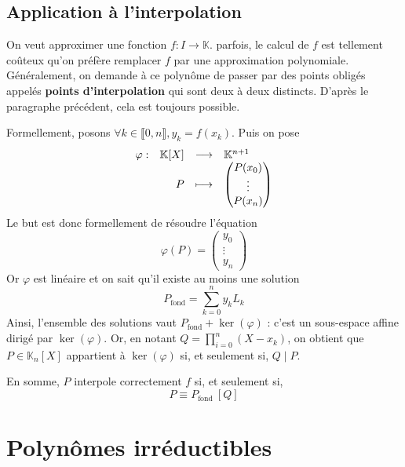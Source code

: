 \documentclass[french]{book}
\newcommand{\K}{\mathbb{K}}
\theoremstyle{plain}
\theoremstyle{definition}
\theoremstyle{remark}
\begin{document}
\subsection{Application à l'interpolation}
On veut approximer une fonction $f:I\rightarrow\K$. parfois, le calcul de $f$ est tellement coûteux qu'on préfère remplacer $f$ par une approximation polynomiale. Généralement, on demande à ce polynôme de passer par des points obligés appelés \textbf{points d'interpolation} qui sont deux à deux distincts. D'après le paragraphe précédent, cela est toujours possible.
\par Formellement, posons $\forall k\in\llbracket0,n\rrbracket, y_k=f(x_k)$. Puis on pose $$
\begin{array}[t]{lrcl}
	\varphi : & \K[X] & \longrightarrow & \K^{n+1} \\
	& P & \longmapsto & \begin{pmatrix}
		P(x_0) \\ \vdots \\ P(x_n)
	\end{pmatrix}
\end{array}
$$ Le but est donc formellement de résoudre l'équation $$\varphi(P)=\begin{pmatrix}
	y_0 \\ \vdots \\ y_n
\end{pmatrix}$$
Or $\varphi$ est linéaire et on sait qu'il existe au moins une solution $$P_{\text{fond}}=\sum_{k=0}^{n}y_kL_k$$ Ainsi, l'ensemble des solutions vaut $P_{\text{fond}}+\ker(\varphi)$ : c'est un sous-espace affine dirigé par $\ker(\varphi)$. Or, en notant $Q=\displaystyle\prod_{i=0}^{n}(X-x_k)$, on obtient que $P\in\K_n[X]$ appartient à $\ker(\varphi)$ si, et seulement si, $Q\mid P$. \par En somme, $P$ interpole correctement $f$ si, et seulement si, $$P\equiv P_{\text{fond}} \ [Q]$$
\section{Polynômes irréductibles}
\end{document}
